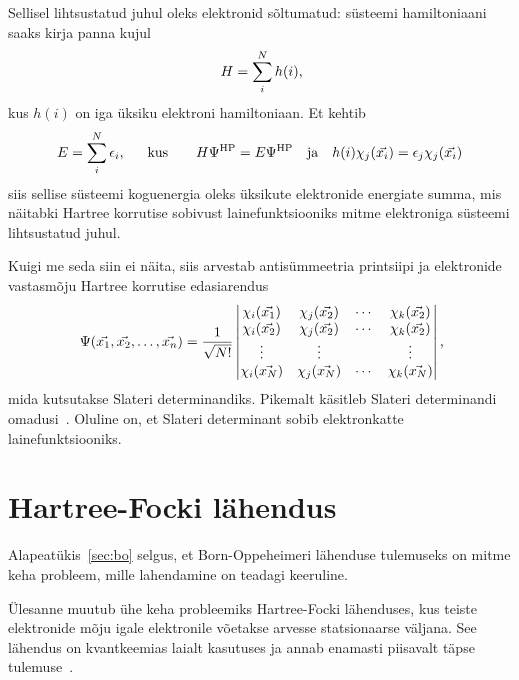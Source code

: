 \documentclass[12pt]{report}
\begin{document}
Sellisel lihtsustatud juhul oleks elektronid sõltumatud: süsteemi hamiltoniaani saaks kirja panna kujul
\begin{align}
    H = \sum_i^N h(i) \rlap{,}
\end{align}
kus \(h(i)\) on iga üksiku elektroni hamiltoniaan.
Et kehtib
\begin{align}
    E = \sum_i^N \epsilon_i \rlap{,}
    \qquad \text{kus} \qquad
    H \Psi^\text{HP} = E \Psi^\text{HP}
    \quad \text{ja} \quad
    h(i) \chi_j(\vec{x_i}) = \epsilon_j \chi_j(\vec{x_i})
\end{align}
siis sellise süsteemi koguenergia oleks üksikute elektronide energiate summa, mis näitabki Hartree korrutise sobivust lainefunktsiooniks mitme elektroniga süsteemi lihtsustatud juhul.

Kuigi me seda siin ei näita, siis arvestab antisümmeetria printsiipi ja elektronide vastasmõju Hartree korrutise edasiarendus
\begin{align}\label{eq:slater}
    \Psi(\vec{x_1}, \vec{x_2}, \ldots, \vec{x_n})
    = \frac{1}{\sqrt{N!}} \begin{vmatrix}
        \chi_i(\vec{x_1}) & \chi_j(\vec{x_2}) & \cdots & \chi_k(\vec{x_2}) \\
        \chi_i(\vec{x_2}) & \chi_j(\vec{x_2}) & \cdots & \chi_k(\vec{x_2}) \\
        \vdots & \vdots & & \vdots \\
        \chi_i(\vec{x_N}) & \chi_j(\vec{x_N}) & \cdots & \chi_k(\vec{x_N}) \\
    \end{vmatrix} \rlap{,}
\end{align}
mida kutsutakse Slateri determinandiks.
Pikemalt käsitleb Slateri determinandi omadusi~\cite{szabo+ostlund}.
Oluline on, et Slateri determinant sobib elektronkatte lainefunktsiooniks.

\section{Hartree-Focki lähendus}\label{sec:hf}

Alapeatükis~\ref{sec:bo} selgus, et Born-Oppeheimeri lähenduse tulemuseks on mitme keha probleem, mille lahendamine on teadagi keeruline.

Ülesanne muutub ühe keha probleemiks Hartree-Focki lähenduses, kus teiste elektronide mõju igale elektronile võetakse arvesse statsionaarse väljana.
See lähendus on kvantkeemias laialt kasutuses ja annab enamasti piisavalt täpse tulemuse~\cite{szabo+ostlund}.
\end{document}
